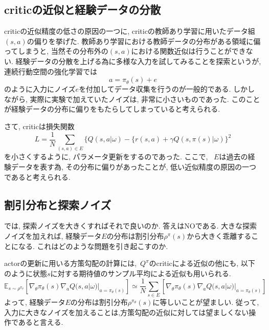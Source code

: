 \documentclass{jsarticle}
\newcommand{\expect}{\mathbb{E}}
\begin{document}
\subsection{criticの近似と経験データの分散}
criticの近似精度の低さの原因の一つに, criticの教師あり学習に用いたデータ組$(s,a)$の偏りを挙げた. 教師あり学習における教師データの分布がある領域に偏ってしまうと, 当然その分布外の$(s,a)$における関数近似は行うことができない. 経験データの分散を上げる為に多様な入力を試してみることを探索というが, 連続行動空間の強化学習では
\begin{equation}
	a = \pi_{\theta}(s) + e
\end{equation}
のように入力にノイズ$e$を付加してデータ収集を行うのが一般的である. しかしながら, 実際に実験で加えていたノイズは, 非常に小さいものであった. このことが経験データの分布に偏りをもたらしてしまっていると考えられる.\par
さて, criticは損失関数
\[L=\frac{1}{N}\sum_{(s,a)\in E}\{Q(s,a|\omega) - \{r(s,a)+\gamma Q(s,\pi(s)|\omega)\}^2\]
を小さくするように, パラメータ更新をするのであった. ここで, ~$E$は過去の経験データを表す為, その分布に偏りがあったことが, 低い近似精度の原因の一つであると考えられる. 


\subsection{割引分布と探索ノイズ}
では, 探索ノイズを大きくすればそれで良いのか. 答えはNOである. 大きな探索ノイズを加えれば, 経験データ$E$の分布は割引分布$\rho^{\pi}(s)$から大きく乖離することになる. これはどのような問題を引き起こすのか.\par
actorの更新に用いる方策勾配の計算には,~$Q^{\pi}$のcriticによる近似の他にも, 以下のように状態$s$に対する期待値のサンプル平均による近似も用いられる.
\[
\expect_{s\sim\rho^{\pi_{\theta}}}[\nabla_{\theta}\pi_{\theta}(s)\nabla_{a}Q(s, a|\omega)|_{a=\pi_{\theta}(s)}] \simeq \frac{1}{N}\sum_{s\in E}[\nabla_{\theta}\pi_{\theta}(s)\nabla_{a}Q(s, a|\omega)|_{a=\pi_{\theta}(s)}]
\]
よって, 経験データ$E$の分布は割引分布$\rho^{\pi_{\theta}}(s)$に等しいことが望ましい. 従って, 入力に大きなノイズを加えることは,方策勾配の近似に対しては望ましくない操作であると言える.
\end{document}
